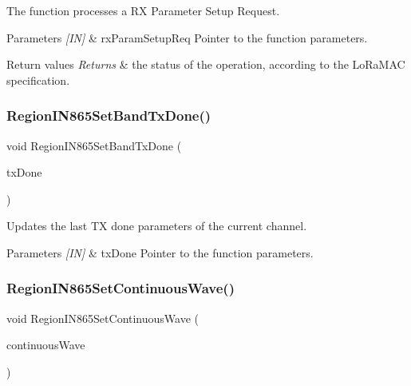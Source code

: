 The function processes a RX Parameter Setup Request. 


\begin{DoxyParams}{Parameters}
{\em \mbox{[}\+I\+N\mbox{]}} & rx\+Param\+Setup\+Req Pointer to the function parameters.\\
\hline
\end{DoxyParams}

\begin{DoxyRetVals}{Return values}
{\em Returns} & the status of the operation, according to the Lo\+Ra\+M\+AC specification. \\
\hline
\end{DoxyRetVals}
\mbox{\label{group__REGIONIN865_ga328c341535bded76103e52c4e4c685fe}} 
\subsubsection{\texorpdfstring{Region\+I\+N865\+Set\+Band\+Tx\+Done()}{RegionIN865SetBandTxDone()}}
{\footnotesize\ttfamily void Region\+I\+N865\+Set\+Band\+Tx\+Done (\begin{DoxyParamCaption}\item[{\hyperlink{group__REGION_gad0524aa0673c0814a71e7a4f9cade3fc}{Set\+Band\+Tx\+Done\+Params\+\_\+t} $\ast$}]{tx\+Done }\end{DoxyParamCaption})}



Updates the last TX done parameters of the current channel. 


\begin{DoxyParams}{Parameters}
{\em \mbox{[}\+I\+N\mbox{]}} & tx\+Done Pointer to the function parameters. \\
\hline
\end{DoxyParams}
\mbox{\label{group__REGIONIN865_gaf8fbc63e4fc4b21a4c69755c1750f194}} 
\subsubsection{\texorpdfstring{Region\+I\+N865\+Set\+Continuous\+Wave()}{RegionIN865SetContinuousWave()}}
{\footnotesize\ttfamily void Region\+I\+N865\+Set\+Continuous\+Wave (\begin{DoxyParamCaption}\item[{\hyperlink{group__REGION_gaf39bb5ba06921139c6d17f88a8d518cd}{Continuous\+Wave\+Params\+\_\+t} $\ast$}]{continuous\+Wave }\end{DoxyParamCaption})}




